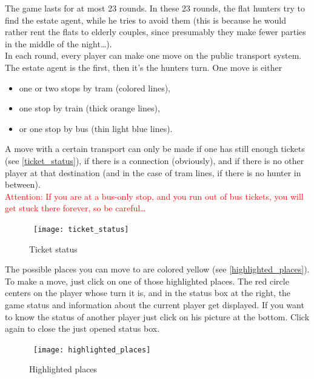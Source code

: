  The game lasts for at most 23 rounds. In these 23 rounds, the flat hunters try to find the estate agent, while he tries to avoid them (this is because he would rather rent the flats to elderly couples, since presumably they make fewer parties in the middle of the night\ldots).\\

In each round, every player can make one move on the public transport system. The estate agent is the first, then it's the hunters turn. One move is either 

\begin{itemize}
  \item  one or two stops by tram (colored lines),
  \item  one stop by train (thick orange lines),
  \item  or one stop by bus (thin light blue lines).
\end{itemize}

A move with a certain transport can only be made if one has still enough tickets (see \autoref{ticket_status}), if there is a connection (obviously), and if there is no other player at that destination (and in the case of tram lines, if there is no hunter in between).\\

 \textcolor{red}{Attention: If you are at a bus-only stop, and you run out of bus tickets, you will get stuck there forever, so be careful\ldots}\\

\begin{figure}[h]
  \centerline{\hbox{
    \texttt{[image: ticket\_status]}
  }}
\caption{Ticket status}
\label{ticket_status}
\end{figure}

The possible places you can move to are colored yellow (see \autoref{highlighted_places}). To make a move, just click on one of those highlighted places. The red circle centers on the player whose turn it is, and in the status box at the right, the game status and information about the current player get displayed. If you want to know the status of another player just click on his picture at the bottom. Click again to close the just opened status box.\\

\begin{figure}[h]
  \centerline{\hbox{
    \texttt{[image: highlighted\_places]}
  }}
\caption{Highlighted places}
\label{highlighted_places}
\end{figure}

